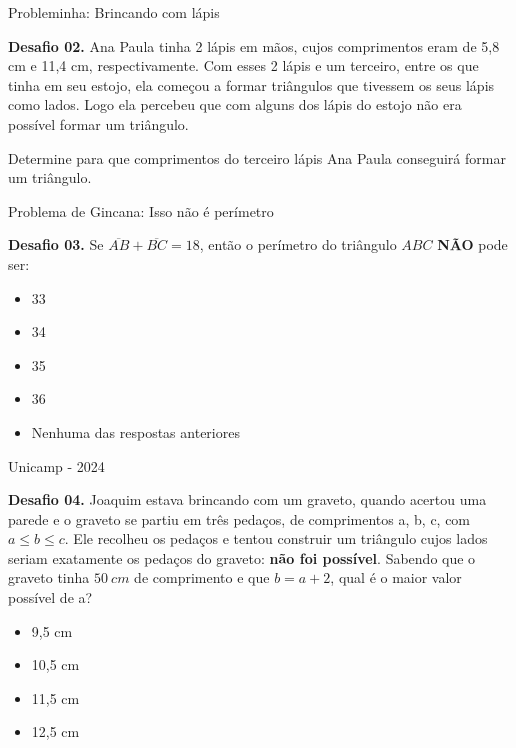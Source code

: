 \documentclass[12pt]{beamer}
\begin{document}
\begin{frame}{Probleminha: Brincando com lápis}

    \begin{exampleblock}{\textbf{Desafio 02.}}
        \justifying
        Ana Paula tinha 2 lápis em mãos, cujos comprimentos eram de 5,8 cm e 11,4 cm, respectivamente. Com esses 2 lápis e um terceiro, entre os que tinha em seu estojo, ela começou a formar triângulos que tivessem os seus lápis como lados. Logo ela percebeu que com alguns dos lápis do estojo não era possível formar um triângulo. 

    \vspace{2mm} 

    Determine para que comprimentos do terceiro lápis Ana Paula conseguirá formar um triângulo.
    \end{exampleblock}
   
\end{frame}

\begin{frame}{Problema de Gincana: Isso não é perímetro}
\begin{exampleblock}{\textbf{Desafio 03.}}
    Se $\overline{AB}+\overline{BC}=18$, então o perímetro do triângulo $ABC$ \textbf{NÃO} pode ser:

    \begin{itemize}
        \item [a)] 33
        \item [b)] 34
        \item [c)] 35
        \item [d)] 36
        \item [e)] Nenhuma das respostas anteriores
    \end{itemize}
\end{exampleblock}
    
\end{frame}

\begin{frame}{Unicamp - 2024}

    \begin{exampleblock}{\textbf{Desafio 04.}}
        \justifying
        Joaquim estava brincando com um graveto, quando acertou uma parede e o graveto se partiu em três pedaços, de comprimentos a, b, c, com $a \leq b \leq c$. Ele recolheu os pedaços e tentou construir um triângulo cujos lados seriam exatamente os pedaços do graveto: \textbf{não foi possível}. Sabendo que o graveto tinha $50\ cm$ de comprimento e que $b = a + 2$, qual é o maior valor possível de a?

        \begin{itemize}
        \item [a)] 9,5 cm
        \item [b)] 10,5 cm
        \item [c)] 11,5 cm %
        \item [d)] 12,5 cm
    \end{itemize}
    \end{exampleblock}
   
\end{frame}
\end{document}
